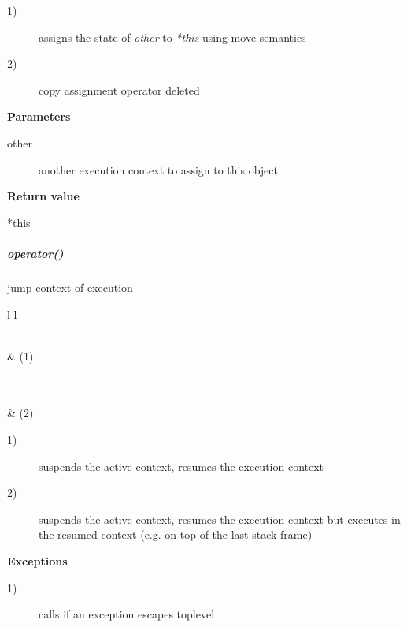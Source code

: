 \begin{description}
    \item[1)] assigns the state of \emph{other} to \emph{*this} using move semantics
    \item[2)] copy assignment operator deleted
\end{description}

{\bfseries Parameters}
\begin{description}
    \item[other]   another execution context to assign to this object\\
\end{description}

{\bfseries Return value}
\begin{description}
    \item[*this]
\end{description}

\subparagraph*{operator()}
jump context of execution\\

\begin{tabular}{ l l }
    \midrule

    \\
     & (1)\\

    \midrule

    \\
    \\
     & (2)\\

    \midrule
\end{tabular}

\begin{description}
    \item[1)] suspends the active context, resumes the execution context
    \item[2)] suspends the active context, resumes the execution context but
        executes  in the resumed context (e.g. on top of the
        last stack frame)
\end{description}

{\bfseries Exceptions}
\begin{description}
    \item[1)] calls  if an exception escapes toplevel \\
\end{description}

